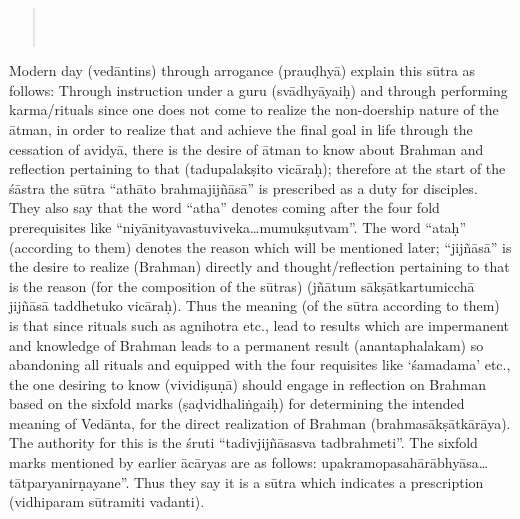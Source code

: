 \begin{verse}
 \\
\\
\end{verse}

Modern day (vedāntins) through arrogance (prauḍhyā) explain this sūtra as follows:  Through instruction under a guru (svādhyāyaiḥ) and through  performing karma/rituals since one does not come to realize the non-doership nature of the ātman, in order to  realize that and achieve the final goal in life through the cessation of avidyā, there is the desire of ātman to know about Brahman and reflection pertaining to that (tadupalakṣito vicāraḥ); therefore at the start of the śāstra the sūtra “athāto brahmajijñāsā” is prescribed as a duty for disciples. They also say that the word “atha” denotes coming after the four fold prerequisites like “niyānityavastuviveka…mumukṣutvam”. The word “ataḥ” (according to them) denotes the reason which will be mentioned later; “jijñāsā” is the desire to realize (Brahman) directly and thought/reflection pertaining to that is the reason (for the composition of the sūtras) (jñātum sākṣātkartumicchā jijñāsā taddhetuko vicāraḥ). Thus the meaning (of the sūtra according to them) is that since rituals such as agnihotra etc., lead to results which are impermanent and knowledge of Brahman leads to a permanent result (anantaphalakam) so abandoning all rituals and  equipped with the four requisites like ‘śamadama’ etc., the one desiring to know (vividiṣuṇā) should engage in reflection on Brahman based on the sixfold marks (ṣaḍvidhaliṅgaiḥ) for determining the intended meaning of Vedānta, for the direct realization of Brahman (brahmasākṣātkā\-rā\-ya). The authority for this is the śruti “tadivjijñāsasva tadbrahmeti”. The sixfold marks mentioned by earlier ācāryas are as follows: upakramopasahārā\-bhyāsa…\-tātparyanirṇa\-yane”. Thus they say it is a sūtra which indicates a prescription (vidhiparam sūtramiti vadanti).

